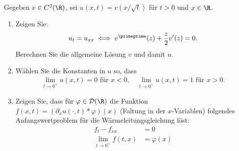 
\begin{exercise}

Gegeben $v \in C^2(\R)$, sei $u(x,t) = v\left(x/\sqrt{t}\right)$ für $t > 0$ und $x \in \R$.
\begin{enumerate}[label = (\roman*)]
  \item Zeigen Sie:
  \begin{align*}
    u_t = u_{xx} \iff v^{\primeprime}(z) + \frac{z}{2}v^{\prime}(z) = 0.
  \end{align*}
  Berechnen Sie die allgemeine Lösung $v$ und damit $u$.
  \item Wählen Sie die Konstanten in $u$ so, dass
  \begin{align*}
    \lim_{t \to 0^+} u(x,t) = 0 \text{ für } x < 0, \quad \lim_{t \to 0^+} u(x,t) = 1
    \text{ für } x > 0.
  \end{align*}
  \item Zeigen Sie, dass für $\varphi \in \mathcal{D}(\R)$ die Funktion
  $f(x,t) = (\partial_x u(\cdot,t)\ast \varphi)(x)$ (Faltung in der $x$-Variablen)
  folgendes Anfangswertproblem für die Wärmeleitungsgleichung löst:
  \begin{align*}
    f_t - f_{xx} &= 0 \\
    \lim_{t \to 0^+} f(t,x) &= \varphi(x)
  \end{align*}
\end{enumerate}
\end{exercise}


